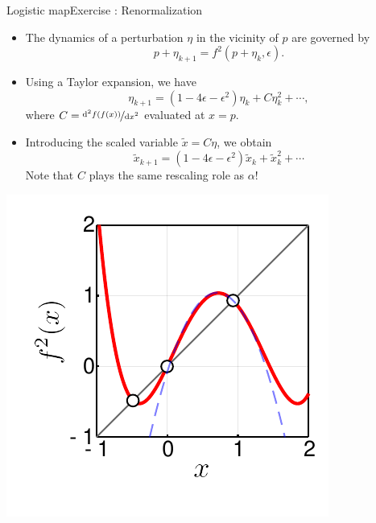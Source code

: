 \documentclass[usenames,dvipsnames,svgnames,10pt,aspectratio=169]{beamer}
\begin{document}
\begin{frame}[t, c]{Logistic map}{Exercise : Renormalization}
	\begin{minipage}{.68\textwidth}
		\begin{itemize}
			\item The dynamics of a perturbation \( \eta \) in the vicinity of \( p \) are governed by
			\[
				p + \eta_{k+1} = f^2(p + \eta_k, \epsilon).
			\]

			\item Using a Taylor expansion, we have
			\[
				\eta_{k+1} = \left( 1 - 4\epsilon - \epsilon^2 \right) \eta_k + C \eta_k^2 + \cdots,
			\]
			where \( C = \nicefrac{\mathrm{d}^2 f(f(x))}{\mathrm{d}x^2} \) evaluated at \(x = p\).

			\medskip

			\item Introducing the scaled variable \( \tilde{x} = C\eta \), we obtain
			\[
				\tilde{x}_{k+1} = \left( 1 - 4\epsilon - \epsilon^2 \right) \tilde{x}_k + \tilde{x}_k^2 + \cdots
			\]
			Note that \( C \) plays the same rescaling role as \( \alpha \)!
		\end{itemize}
	\end{minipage}%
	\hfill
	\begin{minipage}{.28\textwidth}
		\includegraphics[width=\textwidth]{renormalization_2_cycle}
	\end{minipage}

	\vspace{1cm}
\end{frame}
\end{document}
